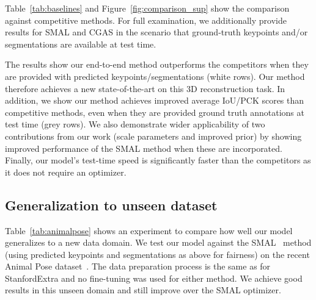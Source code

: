 
Table~\ref{tab:baselines} and Figure~\ref{fig:comparison_sup} show the comparison against competitive methods. For full examination, we additionally provide results for SMAL and CGAS in the scenario that ground-truth keypoints and/or segmentations are available at test time. 

The results show our end-to-end method outperforms the competitors when they are provided with predicted keypoints/segmentations (white rows). Our method therefore achieves a new state-of-the-art on this 3D reconstruction task. In addition, we show our method achieves improved average IoU/PCK scores than competitive methods, even when they are provided ground truth annotations at test time (grey rows). We also demonstrate wider applicability of two contributions from our work (scale parameters and improved prior) by showing improved performance of the SMAL method when these are incorporated. Finally, our model's test-time speed is significantly faster than the competitors as it does not require an optimizer.




\subsection{Generalization to unseen dataset}

Table~\ref{tab:animalpose} shows an experiment to compare how well our model generalizes to a new data domain. We test our model against the SMAL~\cite{zuffi2017menagerie} method (using predicted keypoints and segmentations as above for fairness) on the recent Animal Pose dataset~\cite{animalpose}. The data preparation process is the same as for StanfordExtra and no fine-tuning was used for either method. We achieve good results in this unseen domain and still improve over the SMAL optimizer.

